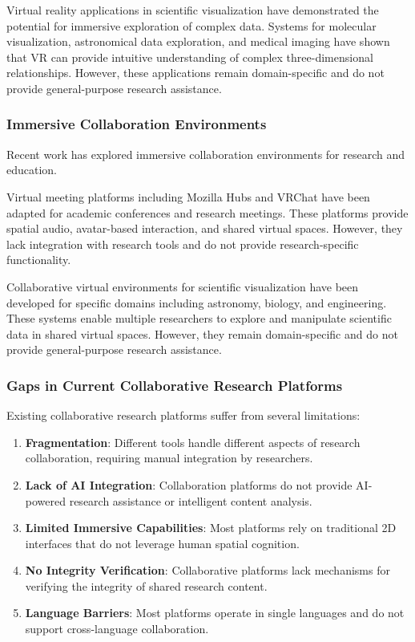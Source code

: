 \documentclass[10pt,twocolumn]{article}
\begin{document}
Virtual reality applications in scientific visualization have demonstrated the potential for immersive exploration of complex data. Systems for molecular visualization, astronomical data exploration, and medical imaging have shown that VR can provide intuitive understanding of complex three-dimensional relationships. However, these applications remain domain-specific and do not provide general-purpose research assistance.

\subsubsection{Immersive Collaboration Environments}

Recent work has explored immersive collaboration environments for research and education.

Virtual meeting platforms including Mozilla Hubs and VRChat have been adapted for academic conferences and research meetings. These platforms provide spatial audio, avatar-based interaction, and shared virtual spaces. However, they lack integration with research tools and do not provide research-specific functionality.

Collaborative virtual environments for scientific visualization have been developed for specific domains including astronomy, biology, and engineering. These systems enable multiple researchers to explore and manipulate scientific data in shared virtual spaces. However, they remain domain-specific and do not provide general-purpose research assistance.

\subsubsection{Gaps in Current Collaborative Research Platforms}

Existing collaborative research platforms suffer from several limitations:

\begin{enumerate}
    \item \textbf{Fragmentation}: Different tools handle different aspects of research collaboration, requiring manual integration by researchers.
    
    \item \textbf{Lack of AI Integration}: Collaboration platforms do not provide AI-powered research assistance or intelligent content analysis.
    
    \item \textbf{Limited Immersive Capabilities}: Most platforms rely on traditional 2D interfaces that do not leverage human spatial cognition.
    
    \item \textbf{No Integrity Verification}: Collaborative platforms lack mechanisms for verifying the integrity of shared research content.
    
    \item \textbf{Language Barriers}: Most platforms operate in single languages and do not support cross-language collaboration.
\end{enumerate}
\end{document}
